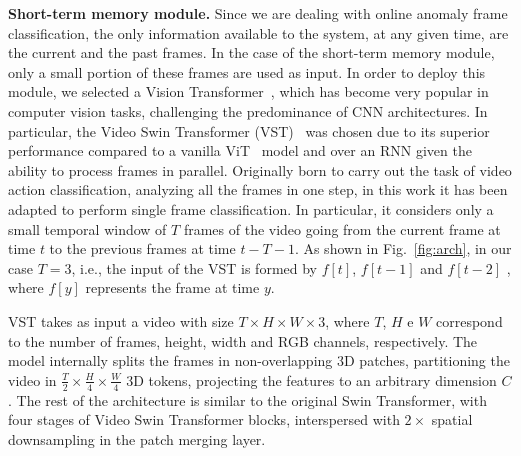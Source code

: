 \noindent\textbf{Short-term memory module.}
Since we are dealing with online anomaly frame classification, the only information available to the system, at any given time, are the current and the past frames.
In the case of the short-term memory module, only a small portion of these frames are used as input.
In order to deploy this module, we selected a Vision Transformer~\cite{DBLP:conf/iclr/DosovitskiyB0WZ21}, which has become very popular in computer vision tasks, challenging the predominance of CNN architectures. 
In particular, the Video Swin Transformer (VST)~\cite{liu_video_2022} was chosen due to its superior performance compared to a vanilla ViT~\cite{DBLP:conf/iclr/DosovitskiyB0WZ21} model
and over an RNN  given the ability to process frames in parallel.
Originally born to carry out the task of video action classification, analyzing all the frames in one step, in this work it has been adapted to perform single frame classification.
In particular, it considers only a small temporal window of $T$ frames of the video going from the current frame at time $t$ to the previous frames at time $t-T-1$.
As shown in Fig.~\ref{fig:arch}, in our case $T=3$, i.e., the input of the VST is formed by $f[t]$, $f[t-1]$ and $f[t-2]$ , where $f[y]$ represents the frame at time $y$.

VST takes as input a video with size $T \times H \times W \times 3$, where $T$, $H$ e $W$ correspond to the number of frames, height, width and RGB channels, respectively.
The model internally splits the frames in non-overlapping 3D patches, partitioning the video in $\frac{T}{2} \times \frac{H}{4} \times \frac{W}{4}$ 3D tokens, projecting the features to an arbitrary dimension $C$.
The rest of the architecture is similar to the original Swin Transformer, with four stages of Video Swin Transformer blocks, 
interspersed with $2\times$ spatial downsampling in the patch merging layer.

